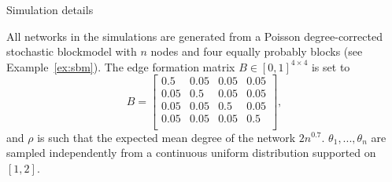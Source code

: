 \documentclass[aspectratio=169]{beamer}
\theoremstyle{remark}
\begin{document}
\begin{frame}{Simulation details}
    
    All networks in the simulations are generated from a Poisson degree-corrected stochastic blockmodel with $n$ nodes and four equally probably blocks (see Example~\ref{ex:sbm}). The edge formation matrix $B \in [0,1]^{4 \times 4}$ is set to
    \begin{equation*}
        B =
        \begin{bmatrix}
            0.5  & 0.05 & 0.05 & 0.05 \\
            0.05 & 0.5  & 0.05 & 0.05 \\
            0.05 & 0.05 & 0.5  & 0.05 \\
            0.05 & 0.05 & 0.05 & 0.5  \\
        \end{bmatrix},
    \end{equation*}
    and $\rho$ is such that the expected mean degree of the network $2 n^{0.7}$. $\theta_1, ..., \theta_n$ are sampled independently from a continuous uniform distribution supported on $[1, 2]$.
\end{frame}
\end{document}
